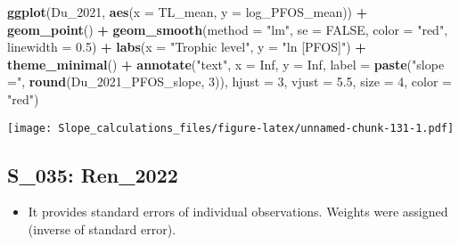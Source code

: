 \documentclass[
]{article}
\newenvironment{Shaded}{\begin{snugshade}}{\end{snugshade}}
\newcommand{\AttributeTok}[1]{\textcolor[rgb]{0.13,0.29,0.53}{#1}}
\newcommand{\ConstantTok}[1]{\textcolor[rgb]{0.56,0.35,0.01}{#1}}
\newcommand{\DecValTok}[1]{\textcolor[rgb]{0.00,0.00,0.81}{#1}}
\newcommand{\FloatTok}[1]{\textcolor[rgb]{0.00,0.00,0.81}{#1}}
\newcommand{\FunctionTok}[1]{\textcolor[rgb]{0.13,0.29,0.53}{\textbf{#1}}}
\newcommand{\NormalTok}[1]{#1}
\newcommand{\SpecialCharTok}[1]{\textcolor[rgb]{0.81,0.36,0.00}{\textbf{#1}}}
\newcommand{\StringTok}[1]{\textcolor[rgb]{0.31,0.60,0.02}{#1}}
\providecommand{\tightlist}{%
  \setlength{\itemsep}{0pt}\setlength{\parskip}{0pt}}
\begin{document}
\begin{Shaded}
\begin{Highlighting}[]
\FunctionTok{ggplot}\NormalTok{(Du\_2021, }\FunctionTok{aes}\NormalTok{(}\AttributeTok{x =}\NormalTok{ TL\_mean, }\AttributeTok{y =}\NormalTok{ log\_PFOS\_mean)) }\SpecialCharTok{+}
  \FunctionTok{geom\_point}\NormalTok{() }\SpecialCharTok{+}
  \FunctionTok{geom\_smooth}\NormalTok{(}\AttributeTok{method =} \StringTok{"lm"}\NormalTok{, }\AttributeTok{se =} \ConstantTok{FALSE}\NormalTok{, }\AttributeTok{color =} \StringTok{"red"}\NormalTok{, }\AttributeTok{linewidth =} \FloatTok{0.5}\NormalTok{) }\SpecialCharTok{+}
  \FunctionTok{labs}\NormalTok{(}\AttributeTok{x =} \StringTok{"Trophic level"}\NormalTok{,}
       \AttributeTok{y =} \StringTok{"ln [PFOS]"}\NormalTok{) }\SpecialCharTok{+}
  \FunctionTok{theme\_minimal}\NormalTok{() }\SpecialCharTok{+}
  \FunctionTok{annotate}\NormalTok{(}\StringTok{"text"}\NormalTok{, }\AttributeTok{x =} \ConstantTok{Inf}\NormalTok{, }\AttributeTok{y =} \ConstantTok{Inf}\NormalTok{, }\AttributeTok{label =} \FunctionTok{paste}\NormalTok{(}\StringTok{"slope ="}\NormalTok{, }\FunctionTok{round}\NormalTok{(Du\_2021\_PFOS\_slope, }\DecValTok{3}\NormalTok{)), }
           \AttributeTok{hjust =} \DecValTok{3}\NormalTok{, }\AttributeTok{vjust =} \FloatTok{5.5}\NormalTok{, }\AttributeTok{size =} \DecValTok{4}\NormalTok{, }\AttributeTok{color =} \StringTok{"red"}\NormalTok{)}
\end{Highlighting}
\end{Shaded}

\texttt{[image: Slope\_calculations\_files/figure-latex/unnamed-chunk-131-1.pdf]}

\subsection{S\_035: Ren\_2022}\label{s_035-ren_2022-1}

\begin{itemize}
\tightlist
\item
  It provides standard errors of individual observations. Weights were
  assigned (inverse of standard error).
\end{itemize}
\end{document}

